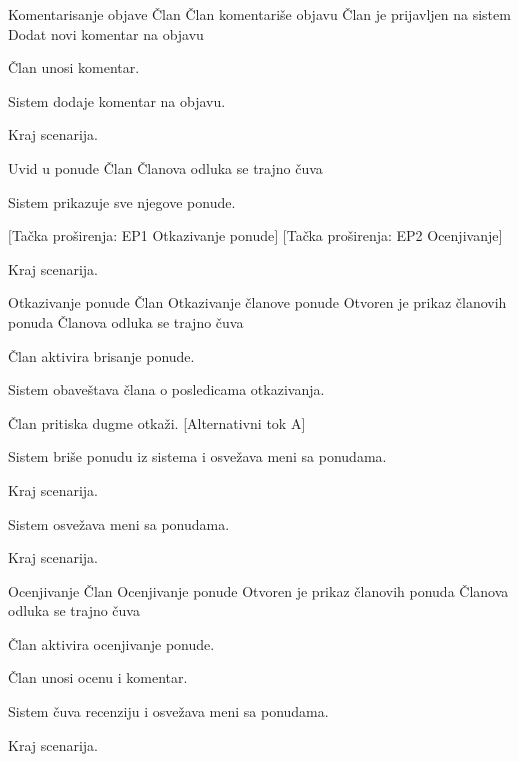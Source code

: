          {Komentarisanje objave}
         {Član}
         {Član komentariše objavu}
         {Član je prijavljen na sistem}
         {Dodat novi komentar na objavu}
         {
            \item Član unosi komentar.
            \item Sistem dodaje komentar na objavu.
            \item Kraj scenarija.
         }
         {}

         {Uvid u ponude}
         {Član}
         {}
         {}
         {Članova odluka se trajno čuva}
         {
            \item Sistem prikazuje sve njegove ponude.
            \item $[$Tačka proširenja: EP1 Otkazivanje ponude$]$ $[$Tačka proširenja: EP2 Ocenjivanje$]$
            \item Kraj scenarija.
         }
         {}

        {Otkazivanje ponude}
        {Član}
        {Otkazivanje članove ponude}
        {Otvoren je prikaz članovih ponuda}
        {Članova odluka se trajno čuva}
        {
            \item Član aktivira brisanje ponude.
            \item Sistem obaveštava člana o posledicama otkazivanja.
            \item Član pritiska dugme otkaži. [Alternativni tok A]
            \item Sistem briše ponudu iz sistema i osvežava meni sa ponudama.
            \item Kraj scenarija.
        }
        {
            {
                \item Sistem osvežava meni sa ponudama.
                \item Kraj scenarija.
            }
        }
        
        {Ocenjivanje}
        {Član}
        {Ocenjivanje ponude}
        {Otvoren je prikaz članovih ponuda}
        {Članova odluka se trajno čuva}
        {
            \item Član aktivira ocenjivanje ponude.
            \item Član unosi ocenu i komentar.
            \item Sistem čuva recenziju i osvežava meni sa ponudama.
            \item Kraj scenarija.
        }
        {}
        
